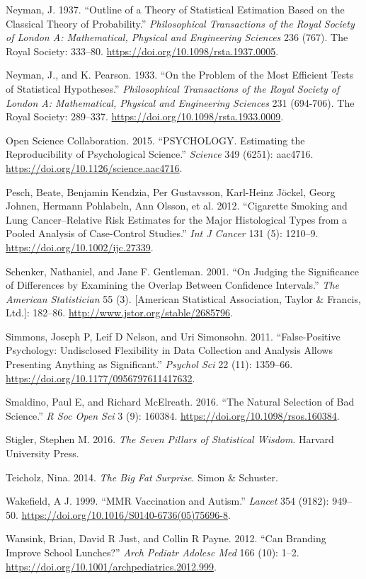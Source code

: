 \documentclass[12pt,]{book}
\theoremstyle{definition}
\theoremstyle{definition}
\theoremstyle{definition}
\theoremstyle{remark}
\begin{document}
\leavevmode\hypertarget{ref-Neyman37}{}%
Neyman, J. 1937. ``Outline of a Theory of Statistical Estimation Based on the Classical Theory of Probability.'' \emph{Philosophical Transactions of the Royal Society of London A: Mathematical, Physical and Engineering Sciences} 236 (767). The Royal Society: 333--80. \url{https://doi.org/10.1098/rsta.1937.0005}.

\leavevmode\hypertarget{ref-Neyman289}{}%
Neyman, J., and K. Pearson. 1933. ``On the Problem of the Most Efficient Tests of Statistical Hypotheses.'' \emph{Philosophical Transactions of the Royal Society of London A: Mathematical, Physical and Engineering Sciences} 231 (694-706). The Royal Society: 289--337. \url{https://doi.org/10.1098/rsta.1933.0009}.

\leavevmode\hypertarget{ref-open:2015}{}%
Open Science Collaboration. 2015. ``PSYCHOLOGY. Estimating the Reproducibility of Psychological Science.'' \emph{Science} 349 (6251): aac4716. \url{https://doi.org/10.1126/science.aac4716}.

\leavevmode\hypertarget{ref-pesc:kend:gust:2012}{}%
Pesch, Beate, Benjamin Kendzia, Per Gustavsson, Karl-Heinz Jöckel, Georg Johnen, Hermann Pohlabeln, Ann Olsson, et al. 2012. ``Cigarette Smoking and Lung Cancer--Relative Risk Estimates for the Major Histological Types from a Pooled Analysis of Case-Control Studies.'' \emph{Int J Cancer} 131 (5): 1210--9. \url{https://doi.org/10.1002/ijc.27339}.

\leavevmode\hypertarget{ref-sche:gent:2001}{}%
Schenker, Nathaniel, and Jane F. Gentleman. 2001. ``On Judging the Significance of Differences by Examining the Overlap Between Confidence Intervals.'' \emph{The American Statistician} 55 (3). {[}American Statistical Association, Taylor \& Francis, Ltd.{]}: 182--86. \url{http://www.jstor.org/stable/2685796}.

\leavevmode\hypertarget{ref-simm:nels:simo:2011}{}%
Simmons, Joseph P, Leif D Nelson, and Uri Simonsohn. 2011. ``False-Positive Psychology: Undisclosed Flexibility in Data Collection and Analysis Allows Presenting Anything as Significant.'' \emph{Psychol Sci} 22 (11): 1359--66. \url{https://doi.org/10.1177/0956797611417632}.

\leavevmode\hypertarget{ref-smal:mcel:2016}{}%
Smaldino, Paul E, and Richard McElreath. 2016. ``The Natural Selection of Bad Science.'' \emph{R Soc Open Sci} 3 (9): 160384. \url{https://doi.org/10.1098/rsos.160384}.

\leavevmode\hypertarget{ref-stig}{}%
Stigler, Stephen M. 2016. \emph{The Seven Pillars of Statistical Wisdom}. Harvard University Press.

\leavevmode\hypertarget{ref-teic:2014}{}%
Teicholz, Nina. 2014. \emph{The Big Fat Surprise}. Simon \& Schuster.

\leavevmode\hypertarget{ref-wake:1999}{}%
Wakefield, A J. 1999. ``MMR Vaccination and Autism.'' \emph{Lancet} 354 (9182): 949--50. \url{https://doi.org/10.1016/S0140-6736(05)75696-8}.

\leavevmode\hypertarget{ref-wans:just:payn:2012}{}%
Wansink, Brian, David R Just, and Collin R Payne. 2012. ``Can Branding Improve School Lunches?'' \emph{Arch Pediatr Adolesc Med} 166 (10): 1--2. \url{https://doi.org/10.1001/archpediatrics.2012.999}.
\end{document}
